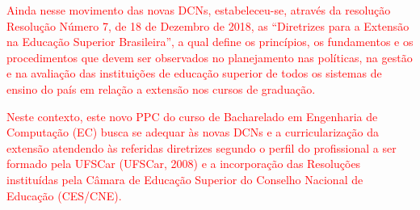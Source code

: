 \textcolor{red}{Ainda nesse movimento das novas DCNs, estabeleceu-se, através da resolução Resolução Número 7, de 18 de Dezembro de 2018, as “Diretrizes para a Extensão na Educação Superior Brasileira”, a qual define os princípios, os fundamentos e os procedimentos que devem ser observados no planejamento nas políticas, na gestão e na avaliação das  instituições de educação superior de todos os sistemas de ensino do país em relação a extensão nos cursos de graduação.}

\textcolor{red}{Neste contexto, este novo PPC do curso de Bacharelado em Engenharia de Computação (EC) busca se adequar às novas DCNs e a curricularização da extensão atendendo às referidas diretrizes segundo o perfil do profissional a ser formado pela UFSCar (UFSCar, 2008) e a incorporação das Resoluções instituídas pela Câmara de Educação Superior do Conselho Nacional de Educação (CES/CNE).}  %

